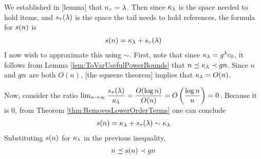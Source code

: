 We established in [lemma] that $n_\tau = \lambda$. Then since $\kappa_\lambda$ is the space needed to hold items, and $s_\tau(\lambda)$ is the space the tail needs to hold references, the formula for $s(n)$ is
\begin{align*}
s(n) = \kappa_\lambda + s_\tau(\lambda)
\end{align*}
I now wish to approximate this using $\sim$. First, note that since $\kappa_\lambda = g^\lambda c_0$, it follows from Lemma \ref{lem:ToVarUsefulPowerBounds} that $n \preceq \kappa_\lambda \prec g{n}$. Since $n$ and $g{n}$ are both $O(n)$, [the squeeze theorem] implies that $\kappa_\lambda = O(n)$.

Now, consider the ratio $\lim_{n \to \infty} \dfrac {s_\tau(\lambda)} {\kappa_\lambda} = \dfrac {O(\log n)} {O(n)} = O \left( \dfrac{\log n}{n} \right) = 0$. Because it is $0$, from Theorem \ref{thm:RemovesLowerOrderTerms} one can conclude
\begin{align*}
s(n) = \kappa_\lambda + s_\tau(\lambda) \sim \kappa_\lambda
\end{align*}
Substituting $s(n)$ for $\kappa_\lambda$ in the previous inequality,
\begin{align*}
n \preceq s(n) \prec g{n}
\end{align*}
